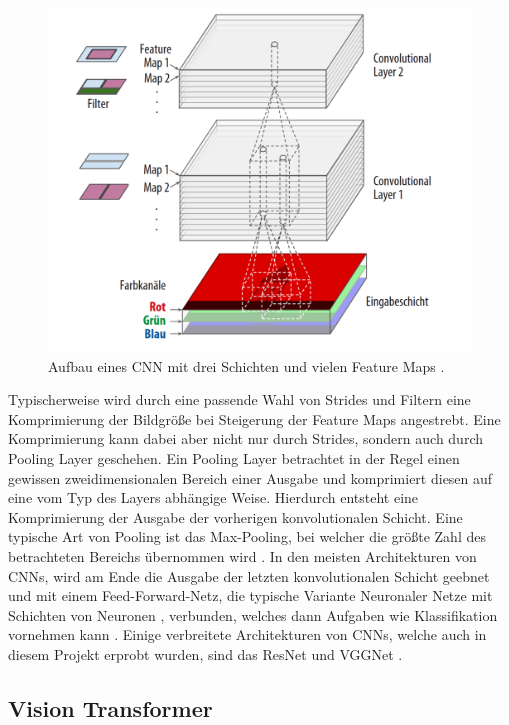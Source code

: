 \documentclass[twoside,a4paper]{IEEEtran}
\begin{document}
\begin{figure}[!htb]
	\includegraphics[width=\columnwidth]{cnn_example}
	\caption{Aufbau eines CNN mit drei Schichten und vielen Feature Maps \cite[S.365]{MACHINE_LEARNING}.}
	\label{bild2}
\end{figure}

Typischerweise wird durch eine passende Wahl von Strides und Filtern eine Komprimierung der Bildgröße bei Steigerung der Feature Maps angestrebt. Eine Komprimierung kann dabei aber nicht nur durch Strides, sondern auch durch Pooling Layer geschehen. Ein Pooling Layer betrachtet in der Regel einen gewissen zweidimensionalen Bereich einer Ausgabe und komprimiert diesen auf eine vom Typ des Layers abhängige Weise. Hierdurch entsteht eine Komprimierung der Ausgabe der vorherigen konvolutionalen Schicht. Eine typische Art von Pooling ist das Max-Pooling, bei welcher die größte Zahl des betrachteten Bereichs übernommen wird \cite[S.369-370]{MACHINE_LEARNING}. In den meisten Architekturen von CNNs, wird am Ende die Ausgabe der letzten konvolutionalen Schicht geebnet und mit einem Feed-Forward-Netz, die typische Variante Neuronaler Netze mit Schichten von Neuronen \cite[S.263]{MACHINE_LEARNING}, verbunden, welches dann Aufgaben wie Klassifikation vornehmen kann \cite[S.371]{MACHINE_LEARNING}. Einige verbreitete Architekturen von CNNs, welche auch in diesem Projekt erprobt wurden, sind das ResNet und VGGNet \cite[S.378-381]{MACHINE_LEARNING}.

\subsection{Vision Transformer} %
\end{document}
